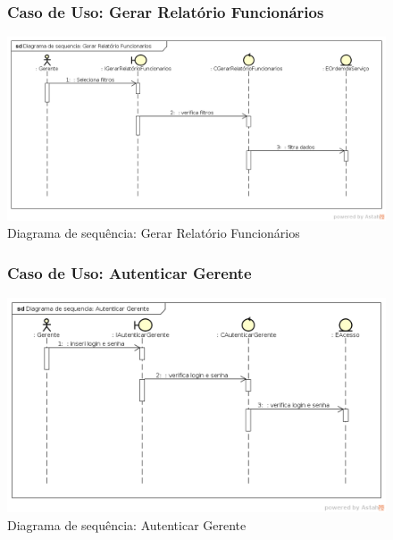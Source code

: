 \documentclass[
	12pt,				%
	openright,
	oneside,			%
	a4paper,			%
	chapter=TITLE,		%
	brazil				%
	]{abntex2}
\begin{document}
\begin{figure}[h!]

\subsubsection*{Caso de Uso: Gerar Relatório Funcionários}

	\caption{Diagrama de sequência: Gerar Relatório Funcionários}
	\begin{center}
	    \includegraphics[scale=0.5]{Arquivos/Analise/D_relatorio_funcionarios}  
	\end{center}
\end{figure}






\begin{figure}[h!]

\subsubsection*{Caso de Uso: Autenticar Gerente}

	\caption{Diagrama de sequência: Autenticar Gerente}
	\begin{center}
	    \includegraphics[scale=0.5]{Arquivos/Analise/D_autenticar_gerente}  
	\end{center}
\end{figure}
\end{document}
